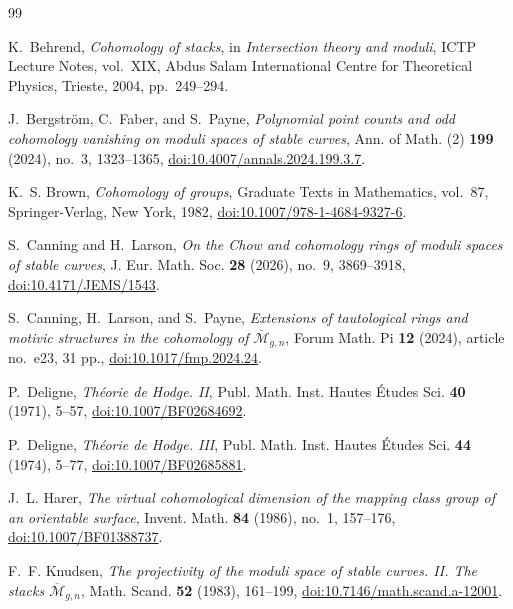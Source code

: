 \documentclass[12pt,reqno]{amsart}
\theoremstyle{definition}
\theoremstyle{remark}
\begin{document}
\begin{thebibliography}{99}

K.~Behrend,
\emph{Cohomology of stacks},
in \emph{Intersection theory and moduli}, ICTP Lecture Notes, vol.~XIX,
Abdus Salam International Centre for Theoretical Physics, Trieste, 2004,
pp.~249--294.

J.~Bergstr\"om, C.~Faber, and S.~Payne,
\emph{Polynomial point counts and odd cohomology vanishing on moduli spaces
of stable curves},
Ann. of Math. (2) \textbf{199} (2024), no.~3, 1323--1365,
\href{https://doi.org/10.4007/annals.2024.199.3.7}
{doi:10.4007/annals.2024.199.3.7}.

K.~S. Brown,
\emph{Cohomology of groups},
Graduate Texts in Mathematics, vol.~87, Springer-Verlag, New York, 1982,
\href{https://doi.org/10.1007/978-1-4684-9327-6}
{doi:10.1007/978-1-4684-9327-6}.

S.~Canning and H.~Larson,
\emph{On the Chow and cohomology rings of moduli spaces of stable curves},
J. Eur. Math. Soc. \textbf{28} (2026), no.~9, 3869--3918,
\href{https://doi.org/10.4171/JEMS/1543}{doi:10.4171/JEMS/1543}.

S.~Canning, H.~Larson, and S.~Payne,
\emph{Extensions of tautological rings and motivic structures in the
cohomology of $\overline{\mathcal M}_{g,n}$},
Forum Math. Pi \textbf{12} (2024), article no.~e23, 31 pp.,
\href{https://doi.org/10.1017/fmp.2024.24}{doi:10.1017/fmp.2024.24}.

P.~Deligne,
\emph{Th\'eorie de Hodge. II},
Publ. Math. Inst. Hautes \'Etudes Sci. \textbf{40} (1971), 5--57,
\href{https://doi.org/10.1007/BF02684692}{doi:10.1007/BF02684692}.

P.~Deligne,
\emph{Th\'eorie de Hodge. III},
Publ. Math. Inst. Hautes \'Etudes Sci. \textbf{44} (1974), 5--77,
\href{https://doi.org/10.1007/BF02685881}{doi:10.1007/BF02685881}.

J.~L. Harer,
\emph{The virtual cohomological dimension of the mapping class group of an
orientable surface},
Invent. Math. \textbf{84} (1986), no.~1, 157--176,
\href{https://doi.org/10.1007/BF01388737}{doi:10.1007/BF01388737}.

F.~F. Knudsen,
\emph{The projectivity of the moduli space of stable curves. II. The stacks
$\overline{\mathcal M}_{g,n}$},
Math. Scand. \textbf{52} (1983), 161--199,
\href{https://doi.org/10.7146/math.scand.a-12001}
{doi:10.7146/math.scand.a-12001}.


\end{thebibliography}
\end{document}
